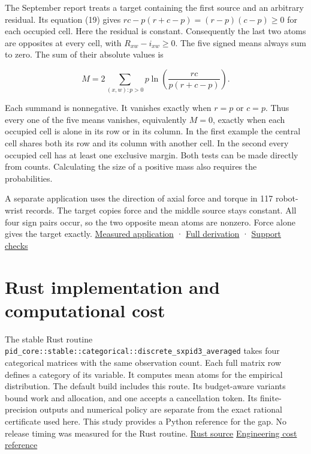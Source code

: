 The September report treats a target containing the first source and an arbitrary residual. Its equation (19) gives \(rc-p(r+c-p)=(r-p)(c-p)\geq0\) for each occupied cell. Here the residual is constant. Consequently the last two atoms are opposites at every cell, with \(R_{xw}-i_{xw}\geq0\). The five signed means always sum to zero. The sum of their absolute values is

\[
M=2\sum_{(x,w):p>0}p\ln\!\left(\frac{rc}{p(r+c-p)}\right).
\]

Each summand is nonnegative. It vanishes exactly when \(r=p\) or \(c=p\). Thus every one of the five means vanishes, equivalently \(M=0\), exactly when each occupied cell is alone in its row or in its column. In the first example the central cell shares both its row and its column with another cell. In the second every occupied cell has at least one exclusive margin. Both tests can be made directly from counts. Calculating the size of a positive mass also requires the probabilities.

A separate application uses the direction of axial force and torque in 117 robot-wrist records. The target copies force and the middle source stays constant. All four sign pairs occur, so the two opposite mean atoms are nonzero. Force alone gives the target exactly. \href{https://github.com/sepahead/pid-rs/blob/main/audit/research/robot-wrist-copied-target/README.md}{Measured application} · \href{https://github.com/sepahead/pid-rs/blob/main/audit/research/categorical-third-source-budget-sharpness/independent/copy-target/COPY-TARGET.md}{Full derivation} · \href{https://github.com/sepahead/pid-rs/blob/main/audit/research/categorical-third-source-budget-sharpness/independent/copy-target/COPY-SUPPORT.json}{Support checks}

\clearpage

\section{Rust implementation and computational cost}\label{rust-implementation-and-computational-cost}

The stable Rust routine \texttt{pid\_core::stable::categorical::discrete\_sxpid3\_averaged} takes four categorical matrices with the same observation count. Each full matrix row defines a category of its variable. It computes mean atoms for the empirical distribution. The default build includes this route. Its budget-aware variants bound work and allocation, and one accepts a cancellation token. Its finite-precision outputs and numerical policy are separate from the exact rational certificate used here. This study provides a Python reference for the gap. No release timing was measured for the Rust routine. \href{https://github.com/sepahead/pid-rs/blob/main/crates/pid-core/src/sxpid.rs}{Rust source} \href{https://github.com/sepahead/pid-rs/blob/main/RUST_IMPLEMENTATION_AND_COST.md}{Engineering cost reference}

